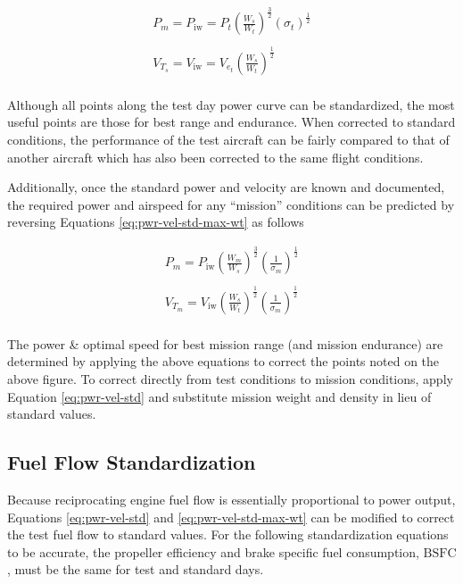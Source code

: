 \documentclass[
]{book}
\begin{document}
\begin{align}
P_m = P_{\text{iw}} = P_t \left( \frac{W_s}{W_t} \right)^{\frac{3}{2}} \left( \sigma_t \right)^{\frac{1}{2}}  \\
\\
V_{T_s} = V_{\text{iw}}= V_{e_t} \left( \frac{W_s}{W_t} \right)^{\frac{1}{2}} \\
\label{eq:pwr-vel-std-max-wt}
\end{align}

Although all points along the test day power curve can be standardized, the most
useful points are those for best range and endurance. When corrected to standard
conditions, the performance of the test aircraft can be fairly compared to that
of another aircraft which has also been corrected to the same flight conditions.

Additionally, once the standard power and velocity are known and documented, the
required power and airspeed for any ``mission'' conditions can be predicted by
reversing Equations \eqref{eq:pwr-vel-std-max-wt} as follows

\begin{align}
P_m = P_{\text{iw}} \left( \frac{W_m}{W_s} \right)^{\frac{3}{2}} \left( \frac{1}{\sigma_m} \right)^{\frac{1}{2}} \\
\\
V_{T_m} = V_{\text{iw}} \left( \frac{W_s}{W_t} \right)^{\frac{1}{2}} \left( \frac{1}{\sigma_m} \right)^{\frac{1}{2}}\\
\label{eq:pwr-vel-msn}
\end{align}

The power \& optimal speed for best mission range (and mission endurance) are
determined by applying the above equations to correct the points noted on the
above figure. To correct directly from test conditions to mission conditions,
apply Equation \eqref{eq:pwr-vel-std} and substitute mission weight and density
in lieu of standard values.

\hypertarget{fuel-flow-standardization}{%
\subsection{Fuel Flow Standardization}\label{fuel-flow-standardization}}

Because reciprocating engine fuel flow is essentially proportional to power
output, Equations \eqref{eq:pwr-vel-std} and \eqref{eq:pwr-vel-std-max-wt} can
be modified to correct the test fuel flow to standard values. For the following
standardization equations to be accurate, the propeller efficiency and brake
specific fuel consumption, \(\mathrm{BSFC}\), must be the same for test and
standard days.
\end{document}
